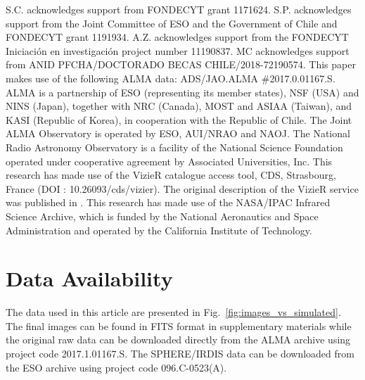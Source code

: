 \documentclass[fleqn,usenatbib,useAMS]{mnras}
\begin{document}
S.C. acknowledges support from FONDECYT grant 1171624. S.P. acknowledges support from the Joint Committee of ESO and the Government of Chile and FONDECYT grant 1191934. A.Z. acknowledges support from the FONDECYT Iniciaci\'on en investigaci\'on project number 11190837. MC acknowledges support from ANID PFCHA/DOCTORADO BECAS CHILE/2018-72190574. This paper makes use of the following ALMA data: ADS/JAO.ALMA \#2017.0.01167.S. ALMA is a partnership of ESO (representing its member states), NSF (USA) and NINS (Japan), together with NRC (Canada), MOST and ASIAA (Taiwan), and KASI (Republic of Korea), in cooperation with the Republic of Chile. The Joint ALMA Observatory is operated by ESO, AUI/NRAO and NAOJ. The National Radio Astronomy Observatory is a facility of the National Science Foundation operated under cooperative agreement by Associated Universities, Inc. This research has made use of the VizieR catalogue access tool, CDS, Strasbourg, France (DOI : 10.26093/cds/vizier). The original description of the VizieR service was published in \citet{2000A&AS..143...23O}. This research has made use of the NASA/IPAC Infrared Science Archive, which is funded by the National Aeronautics and Space Administration and operated by the California Institute of Technology.

\section*{Data Availability}

The data used in this article are presented in Fig.~\ref{fig:images_vs_simulated}. The final images can be found in FITS format in supplementary materials while the original raw data can be downloaded directly from the ALMA archive using project code 2017.1.01167.S. The SPHERE/IRDIS data can be downloaded from the ESO archive using project code 096.C-0523(A).






\end{document}
